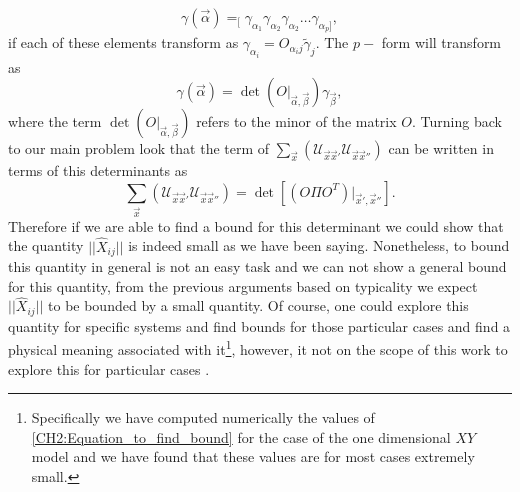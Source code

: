 \begin{equation}
\gamma(\vec{\alpha}) =_{[}\gamma_{\alpha_1}\gamma_{\alpha_2}\gamma_{\alpha_2}\ldots\gamma_{\alpha_p]},
\end{equation}
if each of these elements transform as $\gamma_{\alpha_i} = O_{\alpha_i j} \tilde{\gamma}_{j}$. The $p-$ form will transform as
\begin{equation}
\gamma(\vec{\alpha}) = \operatorname{det}\left(O\big|_{\vec{\alpha},\vec{\beta}}\right)\gamma_{\vec{\beta}},
\label{CH2:transformations_of_operators}
\end{equation}
where the term $\operatorname{det}\left(O\big|_{\vec{\alpha},\vec{\beta}}\right)$ refers to the minor of the matrix $O$. Turning back to our main problem look that the term of $\sum_{\vec{x}}\left(	\mathcal{U}_{\vec{x}\vec{x}'} \mathcal{U}_{\vec{x}\vec{x}''}\right)$ can be written in terms of this determinants as
\begin{equation}
\sum_{\vec{x}}\left(	\mathcal{U}_{\vec{x}\vec{x}'} \mathcal{U}_{\vec{x}\vec{x}''}\right) = \operatorname{det}\left[\left(O\Pi O^T\right)\big|_{\vec{x}',\vec{x}''}\right].
\label{CH2:Equation_to_find_bound}
\end{equation}
\indent Therefore if we are able to find a bound for this determinant we could show that the quantity $||\hat{X}_{ij}||$ is indeed small as we have been saying. Nonetheless, to bound this quantity in general is not an easy task and we can not show a general bound for this quantity, from the previous arguments based on typicality we expect $||\hat{X}_{ij}||$ to be bounded by a small quantity. Of course, one could explore this quantity for specific systems and find bounds for those particular cases and find a physical meaning associated with it\footnote{Specifically we have computed numerically the values of  \eqref{CH2:Equation_to_find_bound} for the case of the one dimensional $XY$ model and we have found that these values are for most cases extremely small.}, however, it not on the scope of this work to explore this for particular cases .






